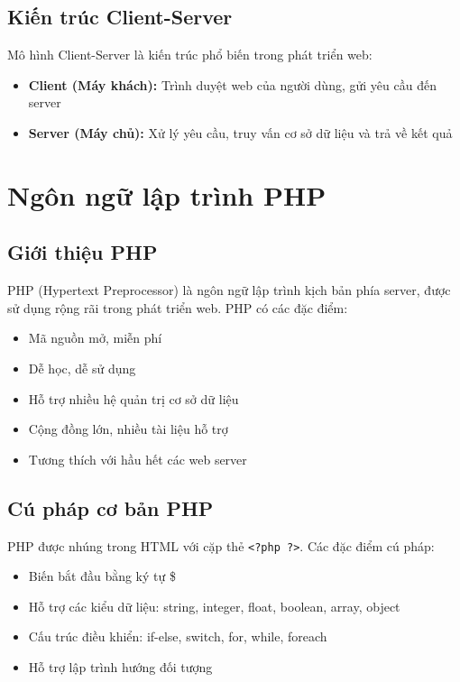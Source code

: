 \documentclass[a4paper,12pt]{report}
\begin{document}
\subsection{Kiến trúc Client-Server}
Mô hình Client-Server là kiến trúc phổ biến trong phát triển web:
\begin{itemize}
    \item \textbf{Client (Máy khách):} Trình duyệt web của người dùng, gửi yêu cầu đến server
    \item \textbf{Server (Máy chủ):} Xử lý yêu cầu, truy vấn cơ sở dữ liệu và trả về kết quả
\end{itemize}

\section{Ngôn ngữ lập trình PHP}

\subsection{Giới thiệu PHP}
PHP (Hypertext Preprocessor) là ngôn ngữ lập trình kịch bản phía server, được sử dụng rộng rãi trong phát triển web. PHP có các đặc điểm:
\begin{itemize}
    \item Mã nguồn mở, miễn phí
    \item Dễ học, dễ sử dụng
    \item Hỗ trợ nhiều hệ quản trị cơ sở dữ liệu
    \item Cộng đồng lớn, nhiều tài liệu hỗ trợ
    \item Tương thích với hầu hết các web server
\end{itemize}

\subsection{Cú pháp cơ bản PHP}
PHP được nhúng trong HTML với cặp thẻ \texttt{<?php ?>}. Các đặc điểm cú pháp:
\begin{itemize}
    \item Biến bắt đầu bằng ký tự \$
    \item Hỗ trợ các kiểu dữ liệu: string, integer, float, boolean, array, object
    \item Cấu trúc điều khiển: if-else, switch, for, while, foreach
    \item Hỗ trợ lập trình hướng đối tượng
\end{itemize}
\end{document}
